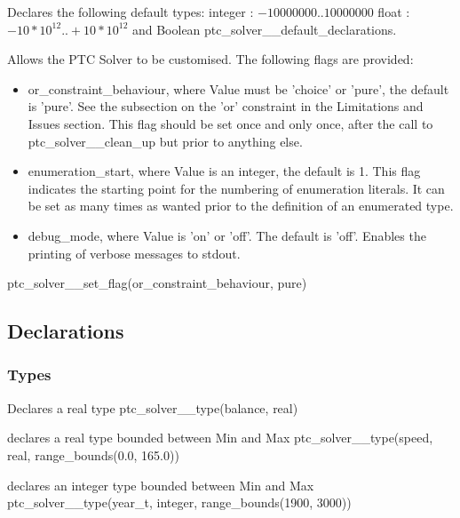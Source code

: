 \documentclass{article}
\begin{document}
    {Declares the following default types:
    integer : $-10 000 000..10 000 000$
        float : $-10*10^{12} .. +10*10^{12}$
    and Boolean}
    {ptc\_solver\_\_default\_declarations.}
    {}

    {Allows the PTC Solver to be customised. The following flags are
provided:
     \begin{itemize}
      \item {or\_constraint\_behaviour}, where Value must be 'choice' or 'pure',
the default is 'pure'.
      See the subsection on the 'or' constraint in the Limitations and Issues
section. This flag should be set once and only once, after the call to ptc\_solver\_\_clean\_up but prior to anything else.
      \item enumeration\_start, where Value is an integer, the default is 1. This flag indicates the starting point for the numbering of enumeration literals. It can be set as many times as wanted prior to the definition of an enumerated type.
      \item debug\_mode, where Value is 'on' or 'off'. The default is 'off'. Enables the printing of verbose messages to stdout.
     \end{itemize}
     }
    {ptc\_solver\_\_set\_flag(or\_constraint\_behaviour, pure)}
    {}

\subsection{Declarations}

\subsubsection{Types}

\hspace{\parindent}
        {Declares a real type}
        {ptc\_solver\_\_type(balance, real)}
        {}

        {declares a real type bounded between Min and Max}
        {ptc\_solver\_\_type(speed, real, range\_bounds(0.0, 165.0))}
        {}

        {declares an integer type bounded between Min and Max}
        {ptc\_solver\_\_type(year\_t, integer, range\_bounds(1900, 3000))}
        {}
\end{document}

